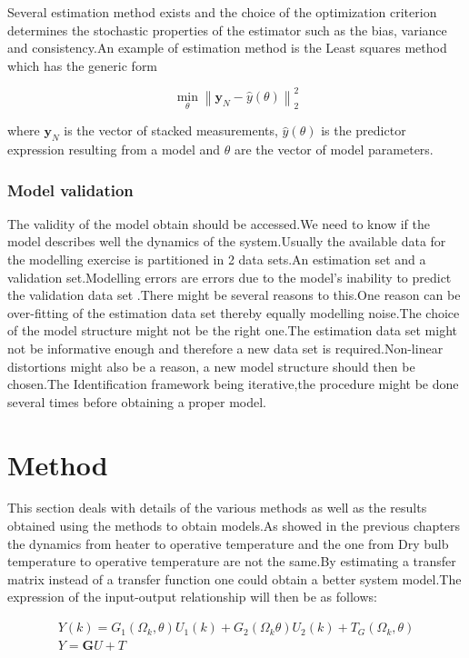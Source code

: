 \documentclass[a4paper,12pt]{article}
\numberwithin{equation}{section}
\begin{document}
Several estimation method exists and the choice of the optimization criterion determines the stochastic properties of the estimator such as the bias, variance and consistency.An example of estimation method is the Least squares method which has the generic form

\[\min _{\theta}\left\|\mathbf{y}_{N}-\hat{y}(\theta)\right\|_{2}^{2}\]

\noindent
where $\mathbf{y}_{N}$ is the vector of stacked measurements, $\hat{y}(\theta)$ is the predictor expression resulting from a model and $\theta$ are the vector of model parameters.

\subsubsection{Model validation}
The validity of the model obtain should be accessed.We need to know if the model describes well the dynamics of the system.Usually the available data for the modelling exercise is partitioned in 2 data sets.An estimation set and a validation set.Modelling errors are errors due to the model's inability  to predict the  validation data set .There might be several reasons to this.One reason can be over-fitting of the estimation data set thereby equally modelling noise.The choice of the model structure might not be the right one.The estimation data set might not be informative enough and therefore a new data set is required.Non-linear distortions might also be a reason, a new model structure should then be chosen.The Identification framework being iterative,the procedure might be done several times before obtaining a proper model. 

\newpage
\section{Method}
This section deals with details of the various methods as well as the results obtained using the methods to obtain models.As showed in the previous chapters the dynamics from heater to operative temperature and the one from Dry bulb temperature to operative temperature are not the same.By estimating  a transfer matrix instead of a transfer function one could obtain a better system model.The expression of the input-output relationship will then be as follows:

\begin{gather}
Y(k)=G_{1}\left(\Omega_{k}, \theta\right) U_{1}(k)+G_{2}\left(\Omega_{k}\theta\right) U_{2}(k)+T_{G}\left(\Omega_{k}, \theta\right) \label{eq:matrix form}\\
Y=\mathbf{G}U + T
\end{gather}
\end{document}
